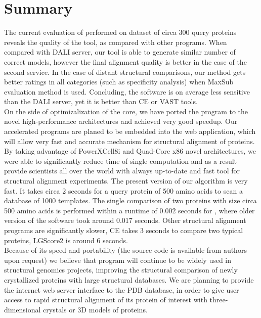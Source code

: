 \section{Summary}
The current evaluation of \prog{} performed on dataset of circa 300 query proteins
reveals the quality of the tool, as compared with other programs. When compared
with DALI server, our tool is able to generate similar number of correct models, however
the final alignment quality is better in the case of the second service. In the 
case of distant structural comparisons, our method gets better ratings in all categories
(such as specificity analysis) when MaxSub evaluation method is used.
Concluding, the \prog{} software is on average less sensitive than the DALI
server, yet it is better than CE or VAST tools.\\
On the side of optimizalization of the core, we have ported the \prog{} 
program to the novel high-performance
architectures and achieved very good speedup.
Our accelerated programs are planed to be embedded into the web application,
which will allow very fast and accurate mechanism for structural alignment of
proteins.
By taking advantage of PowerXCell8i and Quad-Core x86 novel architectures,
we were able to significantly reduce time of single computation and as a result
provide scientists all over the world with always up-to-date and fast tool for
structural alignment experiments.
The present version of our algorithm is very fast. It takes circa 2 seconds 
for a query protein of 500 amino acids to scan a database of 1000 templates.
The single comparison of two proteins with size circa 500 amino acids 
is performed within a runtime of 0.002 seconds for \prog{}, where 
older version of the software took around 0.017 seconds. Other structural
alignment programs are significantly slower, CE takes 3 seconds to compare two
typical proteins, LGScore2 is around 6 seconds. \\
Because of its speed and portability (the source code is available from authors 
upon request) we believe that \prog{} program will continue to be widely used
in structural genomics projects, improving the structural comparison of  newly crystallized
proteins with large structural databases. We are planning to provide the internet web
server interface to the PDB database, in order to give user access to rapid structural 
alignment of its protein of interest with three-dimensional crystals or 3D models
of proteins. 

